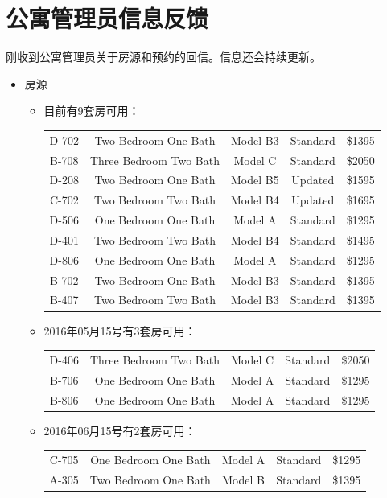 \documentclass[nofonts,a4paper,11pt]{article}
\begin{document}
\section{公寓管理员信息反馈}
刚收到公寓管理员关于房源和预约的回信。信息还会持续更新。
\begin{itemize}
	\item 房源
	\begin{itemize}
		\item 目前有9套房可用：\\
		\begin{tabular}{|c|c|c|c|c|}
			\hline
			D-702 & Two Bedroom One Bath & Model B3 & Standard & \$1395 \\
			B-708 & Three Bedroom Two Bath & Model C & Standard & \$2050 \\
			D-208 & Two Bedroom One Bath & Model B5 & Updated & \$1595 \\
			C-702 & Two Bedroom Two Bath & Model B4 & Updated & \$1695 \\
			D-506 & One Bedroom One Bath & Model A & Standard & \$1295 \\
			D-401 & Two Bedroom Two Bath & Model B4 & Standard & \$1495 \\
			D-806 & One Bedroom One Bath & Model A & Standard & \$1295 \\
			B-702 & Two Bedroom One Bath & Model B3 & Standard & \$1395 \\
			B-407 & Two Bedroom Two Bath & Model B3 & Standard & \$1395 \\
			\hline
		\end{tabular}
		\item 2016年05月15号有3套房可用：\\
		\begin{tabular}{|c|c|c|c|c|}
			\hline
			D-406 & Three Bedroom Two Bath & Model C & Standard & \$2050 \\
			B-706 & One Bedroom One Bath & Model A & Standard & \$1295 \\
			B-806 & One Bedroom One Bath & Model A & Standard & \$1295 \\
			\hline
		\end{tabular}
		\item 2016年06月15号有2套房可用：\\
		\begin{tabular}{|c|c|c|c|c|}
			\hline
			C-705 & One Bedroom One Bath & Model A & Standard & \$1295 \\
			A-305 & Two Bedroom One Bath & Model B & Standard & \$1395 \\

\end{tabular}
\end{itemize}
\end{itemize}
\end{document}
